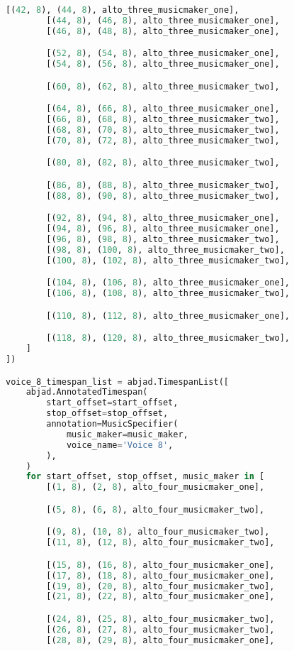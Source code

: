 \begin{lstlisting}[language=Python, caption=Invocation Source Code]
        [(42, 8), (44, 8), alto_three_musicmaker_one],
        [(44, 8), (46, 8), alto_three_musicmaker_one],
        [(46, 8), (48, 8), alto_three_musicmaker_one],

        [(52, 8), (54, 8), alto_three_musicmaker_one],
        [(54, 8), (56, 8), alto_three_musicmaker_one],

        [(60, 8), (62, 8), alto_three_musicmaker_two],

        [(64, 8), (66, 8), alto_three_musicmaker_one],
        [(66, 8), (68, 8), alto_three_musicmaker_two],
        [(68, 8), (70, 8), alto_three_musicmaker_two],
        [(70, 8), (72, 8), alto_three_musicmaker_two],

        [(80, 8), (82, 8), alto_three_musicmaker_two],

        [(86, 8), (88, 8), alto_three_musicmaker_two],
        [(88, 8), (90, 8), alto_three_musicmaker_two],

        [(92, 8), (94, 8), alto_three_musicmaker_one],
        [(94, 8), (96, 8), alto_three_musicmaker_one],
        [(96, 8), (98, 8), alto_three_musicmaker_two],
        [(98, 8), (100, 8), alto_three_musicmaker_two],
        [(100, 8), (102, 8), alto_three_musicmaker_two],

        [(104, 8), (106, 8), alto_three_musicmaker_one],
        [(106, 8), (108, 8), alto_three_musicmaker_two],

        [(110, 8), (112, 8), alto_three_musicmaker_one],

        [(118, 8), (120, 8), alto_three_musicmaker_two],
    ]
])

voice_8_timespan_list = abjad.TimespanList([
    abjad.AnnotatedTimespan(
        start_offset=start_offset,
        stop_offset=stop_offset,
        annotation=MusicSpecifier(
            music_maker=music_maker,
            voice_name='Voice 8',
        ),
    )
    for start_offset, stop_offset, music_maker in [
        [(1, 8), (2, 8), alto_four_musicmaker_one],

        [(5, 8), (6, 8), alto_four_musicmaker_two],

        [(9, 8), (10, 8), alto_four_musicmaker_two],
        [(11, 8), (12, 8), alto_four_musicmaker_two],

        [(15, 8), (16, 8), alto_four_musicmaker_one],
        [(17, 8), (18, 8), alto_four_musicmaker_one],
        [(19, 8), (20, 8), alto_four_musicmaker_two],
        [(21, 8), (22, 8), alto_four_musicmaker_one],

        [(24, 8), (25, 8), alto_four_musicmaker_two],
        [(26, 8), (27, 8), alto_four_musicmaker_two],
        [(28, 8), (29, 8), alto_four_musicmaker_one],


\end{lstlisting}
